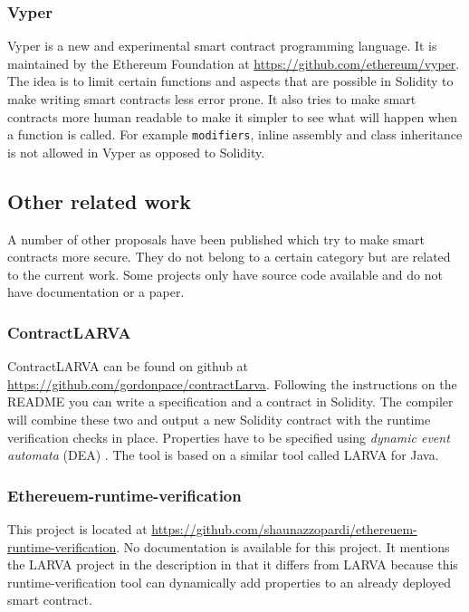 \documentclass[a4paper]{article}
\begin{document}
\subsubsection{Vyper}
Vyper is a new and experimental smart contract programming language. It is maintained by the Ethereum Foundation at \url{https://github.com/ethereum/vyper}. The idea is to limit certain functions and aspects that are possible in Solidity to make writing smart contracts less error prone. It also tries to make smart contracts more human readable to make it simpler to see what will happen when a function is called. For example \texttt{modifiers}, inline assembly and class inheritance is not allowed in Vyper as opposed to Solidity. 

\subsection{Other related work}
A number of other proposals have been published which try to make smart contracts more secure. They do not belong to a certain category but are related to the current work. Some projects only have source code available and do not have documentation or a paper.
\subsubsection{ContractLARVA}
ContractLARVA can be found on github at \url{https://github.com/gordonpace/contractLarva}. Following the instructions on the README you can write a specification and a contract in Solidity. The compiler will combine these two and output a new Solidity contract with the runtime verification checks in place. Properties have to be specified using \textit{dynamic event automata} (DEA) \cite{CGG08FMICS}. The tool is based on a similar tool called LARVA for Java. 

\subsubsection{Ethereuem-runtime-verification}
This project is located at \url{https://github.com/shaunazzopardi/ethereuem-runtime-verification}. No documentation is available for this project. It mentions the LARVA project in the description in that it differs from LARVA because this runtime-verification tool can dynamically add properties to an already deployed smart contract.
\end{document}
